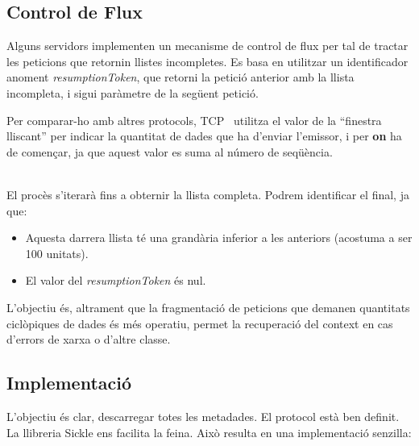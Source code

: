 \clearpage

\subsection{Control de Flux}\label{subsec:flux-control}

Alguns servidors implementen un mecanisme de control de flux per tal de tractar les peticions que retornin llistes incompletes.
Es basa en utilitzar un identificador anoment \textit{resumptionToken}, que retorni la petició anterior amb la llista incompleta, i sigui paràmetre de la següent petició. \\

\begin{tcolorbox}[colback=blue!5!white, colframe=blue!75!black, title=Finestra lliscant]
    Per comparar-ho amb altres protocols, \gls{TCP}~\cite{tcp} utilitza el valor de la ``finestra lliscant'' per indicar la quantitat de dades que ha d'enviar l'emissor,
    i per \textbf{on} ha de començar, ja que aquest valor es suma al número de seqüència.
\end{tcolorbox}

\noindent \\
El procès s'iterarà fins a obternir la llista completa.
Podrem identificar el final, ja que:

\begin{itemize}
    \item Aquesta darrera llista té una grandària inferior a les anteriors (acostuma a ser 100 unitats).
    \item El valor del \textit{resumptionToken} és nul. \\
\end{itemize}

\noindent
L'objectiu és, altrament que la fragmentació de peticions que demanen quantitats ciclòpiques de dades és més operatiu,
permet la recuperació del context en cas d'errors de xarxa o d'altre classe.

\clearpage

\subsection{Implementació}\label{subsec:metadata-implemntation}

L'objectiu és clar, descarregar totes les metadades.
El protocol està ben definit.
La llibreria Sickle ens facilita la feina.
Això resulta en una implementació senzilla:

